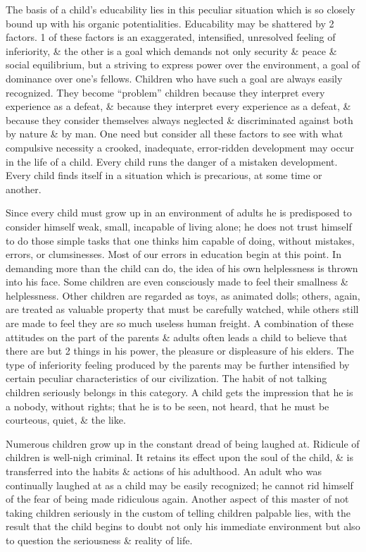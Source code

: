\documentclass{article}
\begin{document}
The basis of a child's educability lies in this peculiar situation which is so closely bound up with his organic potentialities. Educability may be shattered by 2 factors. 1 of these factors is an exaggerated, intensified, unresolved feeling of inferiority, \& the other is a goal which demands not only security \& peace \& social equilibrium, but a striving to express power over the environment, a goal of dominance over one's fellows. Children who have such a goal are always easily recognized. They become ``problem'' children because they interpret every experience as a defeat, \& because they interpret every experience as a defeat, \& because they consider themselves always neglected \& discriminated against both by nature \& by man. One need but consider all these factors to see with what compulsive necessity a crooked, inadequate, error-ridden development may occur in the life of a child. Every child runs the danger of a mistaken development. Every child finds itself in a situation which is precarious, at some time or another.

Since every child must grow up in an environment of adults he is predisposed to consider himself weak, small, incapable of living alone; he does not trust himself to do those simple tasks that one thinks him capable of doing, without mistakes, errors, or clumsinesses. Most of our errors in education begin at this point. In demanding more than the child can do, the idea of his own helplessness is thrown into his face. Some children are even consciously made to feel their smallness \& helplessness. Other children are regarded as toys, as animated dolls; others, again, are treated as valuable property that must be carefully watched, while others still are made to feel they are so much useless human freight. A combination of these attitudes on the part of the parents \& adults often leads a child to believe that there are but 2 things in his power, the pleasure or displeasure of his elders. The type of inferiority feeling produced by the parents may be further intensified by certain peculiar characteristics of our civilization. The habit of not talking children seriously belongs in this category. A child gets the impression that he is a nobody, without rights; that he is to be seen, not heard, that he must be courteous, quiet, \& the like.

Numerous children grow up in the constant dread of being laughed at. Ridicule of children is well-nigh criminal. It retains its effect upon the soul of the child, \& is transferred into the habits \& actions of his adulthood. An adult who was continually laughed at as a child may be easily recognized; he cannot rid himself of the fear of being made ridiculous again. Another aspect of this master of not taking children seriously in the custom of telling children palpable lies, with the result that the child begins to doubt not only his immediate environment but also to question the seriousness \& reality of life.
\end{document}
